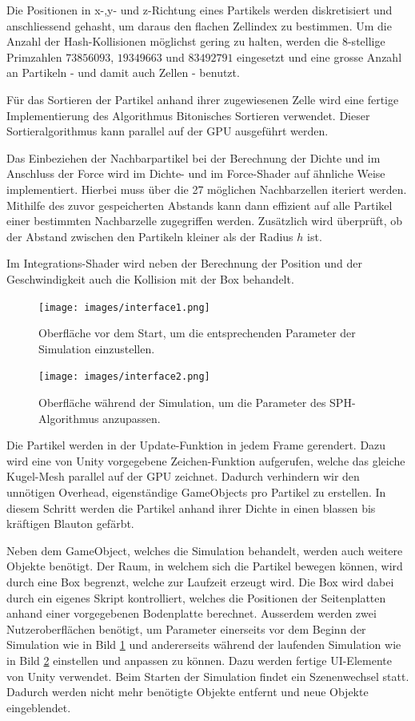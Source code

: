 \documentclass[a4paper]{paper}
\begin{document}
Die Positionen in x-,y- und z-Richtung eines Partikels werden diskretisiert und anschliessend gehasht, um daraus den flachen Zellindex zu bestimmen. Um die Anzahl der Hash-Kollisionen möglichst gering zu halten, werden die 8-stellige Primzahlen $73856093$, $19349663$ und $83492791$ eingesetzt und eine grosse Anzahl an Partikeln - und damit auch Zellen - benutzt.

Für das Sortieren der Partikel anhand ihrer zugewiesenen Zelle wird eine fertige Implementierung des Algorithmus Bitonisches Sortieren verwendet. Dieser Sortieralgorithmus kann parallel auf der GPU ausgeführt werden.

Das Einbeziehen der Nachbarpartikel bei der Berechnung der Dichte und im Anschluss der Force wird im Dichte- und im Force-Shader auf ähnliche Weise implementiert. Hierbei muss über die 27 möglichen Nachbarzellen iteriert werden. Mithilfe des zuvor gespeicherten Abstands kann dann effizient auf alle Partikel einer bestimmten Nachbarzelle zugegriffen werden. Zusätzlich wird überprüft, ob der Abstand zwischen den Partikeln kleiner als der Radius $h$ ist.

Im Integrations-Shader wird neben der Berechnung der Position und der Geschwindigkeit auch die Kollision mit der Box behandelt.


\begin{figure}[t]
	\centering
	\texttt{[image: images/interface1.png]}
	\caption{Oberfläche vor dem Start, um die entsprechenden Parameter der Simulation einzustellen.}
	\label{fig:interface1}
\end{figure}

\begin{figure}[t]
	\centering
	\texttt{[image: images/interface2.png]}
	\caption{Oberfläche während der Simulation, um die Parameter des SPH-Algorithmus anzupassen.}
	\label{fig:interface2}
\end{figure}



Die Partikel werden in der Update-Funktion in jedem Frame gerendert. Dazu wird eine von Unity vorgegebene Zeichen-Funktion aufgerufen, welche das gleiche Kugel-Mesh parallel auf der GPU zeichnet. Dadurch verhindern wir den unnötigen Overhead, eigenständige GameObjects pro Partikel zu erstellen. In diesem Schritt werden die Partikel anhand ihrer Dichte in einen blassen bis kräftigen Blauton gefärbt.

Neben dem GameObject, welches die Simulation behandelt, werden auch weitere Objekte benötigt. Der Raum, in welchem sich die Partikel bewegen können, wird durch eine Box begrenzt, welche zur Laufzeit erzeugt wird. Die Box wird dabei durch ein eigenes Skript kontrolliert, welches die Positionen der Seitenplatten anhand einer vorgegebenen Bodenplatte berechnet.
Ausserdem werden zwei Nutzeroberflächen benötigt, um Parameter einerseits vor dem Beginn der Simulation wie in Bild \ref{fig:interface1} und andererseits während der laufenden Simulation wie in Bild \ref{fig:interface2} einstellen und anpassen zu können. Dazu werden fertige UI-Elemente von Unity verwendet. Beim Starten der Simulation findet ein Szenenwechsel statt. Dadurch werden nicht mehr benötigte Objekte entfernt und neue Objekte eingeblendet.
\end{document}
